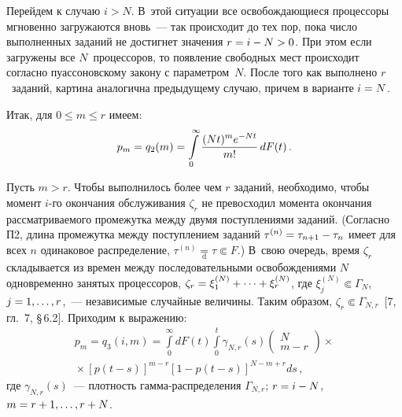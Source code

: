 \begin{multicols}{2}
  Перейдем к случаю $i>N$. В~этой ситуации все освобождающиеся процессоры 
мгновенно загружаются вновь~--- так происходит до тех пор, пока число выполненных 
заданий не достигнет значения $r\hm=i\hm-N\hm>0$. При этом если загружены все 
$N$~процессоров, то появление свободных мест происходит согласно пуассоновскому 
закону с параметром~$N$. После того как выполнено $r$~заданий, картина аналогична 
предыдущему случаю, причем в варианте $i\hm=N$.
  
  Итак, для $0\leq m\leq r$ имеем:
  \begin{equation}
  p_m=q_2(m) =\int\limits_0^\infty \displaystyle\frac{\displaystyle (Nt)^{m}e^{-Nt}\mathstrut}{\displaystyle m!\mathstrut}\,dF(t)\,.
  \label{e4-kon}
\end{equation}

  Пусть $m>r$. Чтобы выполнилось более чем $r$ заданий, необходимо, чтобы момент 
$i$-го окончания обслуживания $\zeta_r$ не превосходил момента окончания 
рассматриваемого промежутка между двумя поступлениями заданий. (Согласно П2, длина 
промежутка между поступлением заданий $\tau^{(n)}\hm= \tau_{n+1}\hm-\tau_n$ имеет 
для всех $n$ одинаковое распределение, $\tau^{(n)} \underset{\mathrm{d}}{=}\tau\Subset F$.) В~свою 
очередь, время $\zeta_r$ складывается из времен между последовательными 
осво\-бож\-де\-ни\-ями $N$ одновременно занятых процессоров, 
$\zeta_r\hm=\xi_1^{(N)}+\cdots+\xi_r^{(N)}$, где $\xi_j^{(N)}\Subset \Gamma_N$, 
$j\hm=1,\ldots , r$,~--- независимые случайные величины. Таким образом, $\zeta_r\Subset 
\Gamma_{N,r}$~[7, гл.~7, \S\,6.2]. Приходим к выражению:
  \begin{multline}
  p_m=q_3(i,m) =\int\limits_0^\infty dF(t) \int\limits_0^t \gamma_{N,r}(s) \begin{pmatrix}
  N \\ m-r\end{pmatrix}\times{}\\
  {}\times
  \left[ p(t-s)\right]^{m-r}\left[ 1-p(t-s)\right]^{N-m+r}ds\,,
  \label{e5-kon}
  \end{multline}
где $\gamma_{N,r}(s)$~--- плотность гам\-ма-рас\-пре\-де\-ле\-ния $\Gamma_{N,r}$; 
$r\hm= i\hm-N$, $m\hm= r\hm+1, \ldots , r+N$.
  

\end{multicols}
